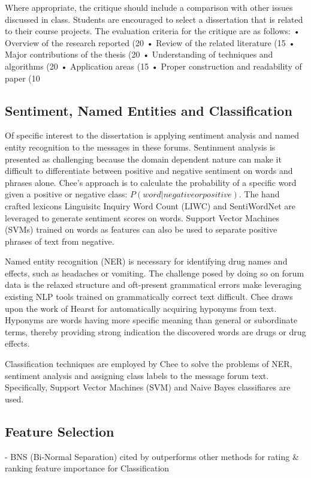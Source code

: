 \documentclass[twoside,11pt]{article}
\begin{document}
Where appropriate, the critique should
include a comparison with other issues discussed in class. Students are encouraged to select a
dissertation that is related to their course projects.
The evaluation criteria for the critique are as follows:
• Overview of the research reported (20%
• Review of the related literature (15%
• Major contributions of the thesis (20%
• Understanding of techniques and algorithms (20%
• Application areas (15%
• Proper construction and readability of paper (10%




\newpage

\subsection{Sentiment, Named Entities and Classification}
Of specific interest to the dissertation is applying sentiment analysis and named
entity recognition to the messages in these forums. Sentinment analysis is presented
as challenging because the domain dependent nature \citep{Turney, 2002}
can make it difficult to differentiate between positive and negative sentiment on words and phrases alone.
Chee's approach is to calculate the probability of a specific word given a positive or negative class: $P(word| negative or positive)$.
The hand crafted lexicons Linguisitc Inquiry Word Count (LIWC) and SentiWordNet
are leveraged to generate sentiment scores on words. Support Vector Machines (SVMs)
trained on words as features can also be used to separate positive phrases of
text from negative.

Named entity recognition (NER) is necessary for identifying drug names and
effects, such as headaches or vomiting. The challenge posed by doing so
on forum data is the relaxed structure and oft-present grammatical errors
make leveraging existing NLP tools trained on grammatically correct text
difficult. Chee draws upon the work of Hearst \citep{Hearst} for automatically
acquiring hyponyms from text. Hyponyms are words having more specific meaning
than general or subordinate terms, thereby providing strong indication the discovered
words are drugs or drug effects.

Classification techniques are employed by Chee to solve the problems of NER,
sentiment analysis and assigning class labels to the message forum text. Specifically,
Support Vector Machines (SVM) and Naive Bayes classifiares are used.




\subsection{Feature Selection}
- BNS (Bi-Normal Separation) cited by \citep{Forman}
outperforms other methods for rating & ranking feature importance for Classification
\end{document}
